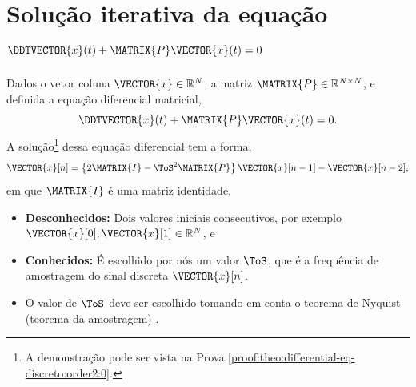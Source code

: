 \section{ Solução iterativa da equação $\DDTVECTOR{x}(t) + \MATRIX{P} \VECTOR{x}(t)=0$ }

\begin{theorem}[Equação 
$\DDTVECTOR{x}(t) + \MATRIX{P} \VECTOR{x}(t)=0$ com diferenças finitas:]
\label{theo:differential-eq-discreto:order2:0}
Dados o vetor coluna $\VECTOR{x} \in \mathbb{R}^N$, a matriz $\MATRIX{P} \in \mathbb{R}^{N\times N}$, 
e definida a equação diferencial matricial,
\begin{equation}\label{eq:theo:secondorder:1}
\DDTVECTOR{x}(t) + \MATRIX{P} \VECTOR{x}(t)=0.
\end{equation}
A solução\footnote{A
demonstração pode ser vista na Prova \ref{proof:theo:differential-eq-discreto:order2:0}.} dessa 
equação diferencial tem  a forma,
\begin{equation}\label{eq:theo:secondorder:2}
  \VECTOR{x}[n]=\left\{2\MATRIX{I} - \ToS^2 \MATRIX{P}\right\}\VECTOR{x}[n-1]-\VECTOR{x}[n-2],
\end{equation}
em que $\MATRIX{I}$ é uma matriz identidade.
\begin{itemize}
\item \textbf{Desconhecidos:} Dois valores iniciais consecutivos, 
por exemplo $\VECTOR{x}[0],\VECTOR{x}[1] \in \mathbb{R}^{N}$, e
\item  \textbf{Conhecidos:} É escolhido por nós um valor $\ToS$, 
que é a frequência de amostragem do sinal discreta $\VECTOR{x}[n]$.
\end{itemize}
\end{theorem}

\begin{tcbattention}
\begin{itemize}
\item O valor de $\ToS$ deve ser escolhido tomando em conta o teorema de Nyquist (teorema da amostragem) 
\cite[pp. 67]{rochol2009comunicacao} \cite[pp. 122]{forouzan2009comunicacao}.
\end{itemize}
\end{tcbattention}

